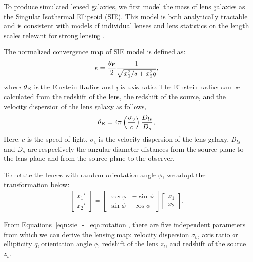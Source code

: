 \documentclass{emulateapj}
\begin{document}
To produce simulated lensed galaxies, we first model the mass of lens
galaxies as the Singular Isothermal Ellipsoid (SIE). This model is
both analytically tractable and is consistent with models of
individual lenses and lens statistics on the length scales relevant
for strong lensing
\citep[e.g.]{koopmans_etal06,gavazzi_etal07,dye_etal08,liandchen_09}.

The normalized convergence map of SIE model is defined as:
\begin{equation}\label{eqn:sie}
\kappa = \frac{\theta_{\rm E}}{2}\frac{1}{\sqrt{x_1^2/q+x_2^2 q}},
\end{equation}
where $\theta_{\rm E}$ is the Einstein Radius and $q$ is axis ratio.
The Einstein radius can be calculated from the redshift of the
lens, the redshift of the source, and the velocity dispersion of the
lens galaxy as follows,
\begin{equation}
\theta_{\rm E} = 4\pi\left(\frac{\sigma_v}{c}\right)\frac{D_{ls}}{D_{s}}, 
\end{equation}
Here, $c$ is the speed of light, $\sigma_v$ is the velocity dispersion
of the lens galaxy, $D_{ls}$ and $D_{s}$ are respectively the angular
diameter distances from the source plane to the lens plane and from
the source plane to the observer.

To rotate the lenses with random orientation angle $\phi$, we adopt
the transformation below:
\begin{eqnarray}
\label{eqn:rotation}
\begin{bmatrix}
    x_{1}\prime      \\
    x_{2}\prime 
\end{bmatrix}
= 
\begin{bmatrix}
    \cos \phi  & -\sin \phi      \\
    \sin \phi  & ~\cos \phi      
\end{bmatrix} 
\begin{bmatrix}
    x_1      \\
    x_2      
\end{bmatrix}.
\end{eqnarray}

From Equations~\ref{eqn:sie}~-~\ref{eqn:rotation}, there are five
independent parameters from which we can derive the lensing map:
velocity dispersion $\sigma_v$, axis ratio or ellipticity $q$,
orientation angle $\phi$, redshift of the lens $z_l$, and redshift of
the source $z_s$.  
\end{document}
